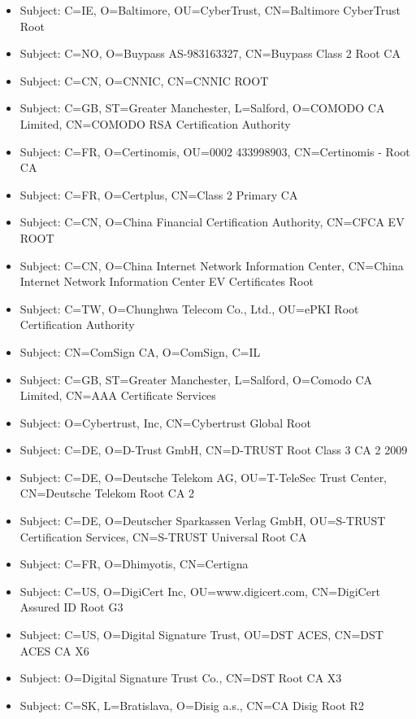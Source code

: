 \documentclass[xcolor={dvipsnames,svgnames},hyperref=dvips]{beamer}
\begin{document}
	\begin{frame}
		\begin{itemize}
		\item Subject: C=IE, O=Baltimore, OU=CyberTrust, CN=Baltimore CyberTrust Root
		\item Subject: C=NO, O=Buypass AS-983163327, CN=Buypass Class 2 Root CA
		\item Subject: C=CN, O=CNNIC, CN=CNNIC ROOT
		\item Subject: C=GB, ST=Greater Manchester, L=Salford, O=COMODO CA Limited, CN=COMODO RSA Certification Authority
		\item Subject: C=FR, O=Certinomis, OU=0002 433998903, CN=Certinomis - Root CA
		\end{itemize}
	\end{frame}
	\begin{frame}
		\begin{itemize}
		\item Subject: C=FR, O=Certplus, CN=Class 2 Primary CA
		\item Subject: C=CN, O=China Financial Certification Authority, CN=CFCA EV ROOT
		\item Subject: C=CN, O=China Internet Network Information Center, CN=China Internet Network Information Center EV Certificates Root
		\item Subject: C=TW, O=Chunghwa Telecom Co., Ltd., OU=ePKI Root Certification Authority
		\item Subject: CN=ComSign CA, O=ComSign, C=IL
		\end{itemize}
	\end{frame}
	\begin{frame}
		\begin{itemize}
		\item Subject: C=GB, ST=Greater Manchester, L=Salford, O=Comodo CA Limited, CN=AAA Certificate Services
		\item Subject: O=Cybertrust, Inc, CN=Cybertrust Global Root
		\item Subject: C=DE, O=D-Trust GmbH, CN=D-TRUST Root Class 3 CA 2 2009
		\item Subject: C=DE, O=Deutsche Telekom AG, OU=T-TeleSec Trust Center, CN=Deutsche Telekom Root CA 2
		\item Subject: C=DE, O=Deutscher Sparkassen Verlag GmbH, OU=S-TRUST Certification Services, CN=S-TRUST Universal Root CA
		\end{itemize}
	\end{frame}
	\begin{frame}
		\begin{itemize}
		\item Subject: C=FR, O=Dhimyotis, CN=Certigna
		\item Subject: C=US, O=DigiCert Inc, OU=www.digicert.com, CN=DigiCert Assured ID Root G3
		\item Subject: C=US, O=Digital Signature Trust, OU=DST ACES, CN=DST ACES CA X6
		\item Subject: O=Digital Signature Trust Co., CN=DST Root CA X3
		\item Subject: C=SK, L=Bratislava, O=Disig a.s., CN=CA Disig Root R2
		\end{itemize}
	\end{frame}
\end{document}
